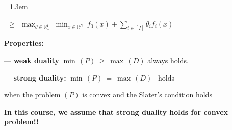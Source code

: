 \documentclass[10pt]{article}
\newenvironment{board}{%
  \par\vspace{4pt}
  \begingroup\leftskip=1.3em\relax\parskip=2pt\relax}{%
  \par\endgroup\vspace{4pt}}
\begin{document}
\begin{board}
\hspace{3.0cm}{if \ $f_i(x) \le 0 \ \ \forall i$, \quad then \quad $= 0$}
\vspace{3pt}

\hspace{3.0cm}{if \ $\exists\, i : f_i(x) > 0$, \quad then \quad $= +\infty$}
\vspace{8pt}

{$\displaystyle \ \ \ge\ \ \max_{\theta \in \mathbb{R}^I_+}\ \min_{x \in \mathbb{R}^N}\ f_0(x)
  + \sum_{i \in [I]} \theta_i f_i(x)$}
\vspace{14pt}

\textbf{Properties:}
\vspace{4pt}

\quad --- \textbf{weak duality} \qquad $\min\,(P) \ \ge\ \max\,(D)$ \qquad always holds.
\vspace{6pt}

\quad --- \textbf{strong duality:} \qquad $\min\,(P) \ =\ \max\,(D)$ \ holds
\vspace{3pt}

\qquad\quad when the problem $(P)$ is convex and the \underline{Slater's condition} holds
\vspace{3pt}

\vspace{16pt}

{\textbf{In this course, we assume that strong duality holds for convex problem!!}}
\end{board}

\newpage
\end{document}
